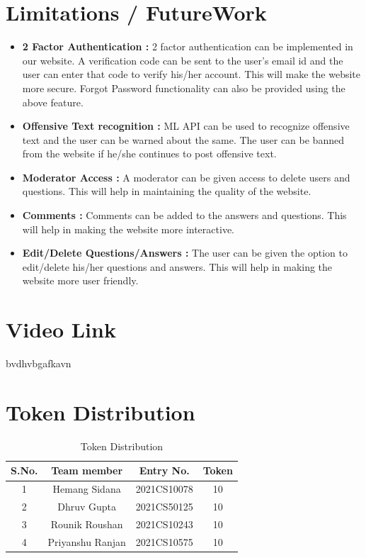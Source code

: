 \documentclass{article}
\begin{document}
\section{Limitations / FutureWork}
\begin{itemize}
    \item \textbf{2 Factor Authentication :} 2 factor authentication can be implemented in our website. A verification code can be sent to the user's email id and the user can enter that code to verify his/her account. This will make the website more secure. Forgot Password functionality can also be provided using the above feature.
    \item \textbf{Offensive Text recognition :} ML API can be used to recognize offensive text and the user can be warned about the same. The user can be banned from the website if he/she continues to post offensive text.
    \item \textbf{Moderator Access :} A moderator can be given access to delete users and questions. This will help in maintaining the quality of the website.
    \item \textbf{Comments :} Comments can be added to the answers and questions. This will help in making the website more interactive.
    \item \textbf{Edit/Delete Questions/Answers :} The user can be given the option to edit/delete his/her questions and answers. This will help in making the website more user friendly.
\end{itemize}
\section{Video Link}
bvdhvbgafkavn
\section{Token Distribution}

\begin{table}[h]
    \centering
    \begin{tabular}{|c|c|c|c|}
    \hline
    \textbf{S.No.} & \textbf{Team member} & \textbf{Entry No.} & \textbf{Token} \\ \hline
    1              & Hemang Sidana        & 2021CS10078        & 10             \\ \hline
    2              & Dhruv Gupta          & 2021CS50125        & 10             \\ \hline
    3              & Rounik Roushan       & 2021CS10243        & 10             \\ \hline
    4              & Priyanshu Ranjan     & 2021CS10575        & 10             \\ \hline
    \end{tabular}
    \caption{Token Distribution}
    \label{tab:token-split}
    \end{table}
\end{document}
